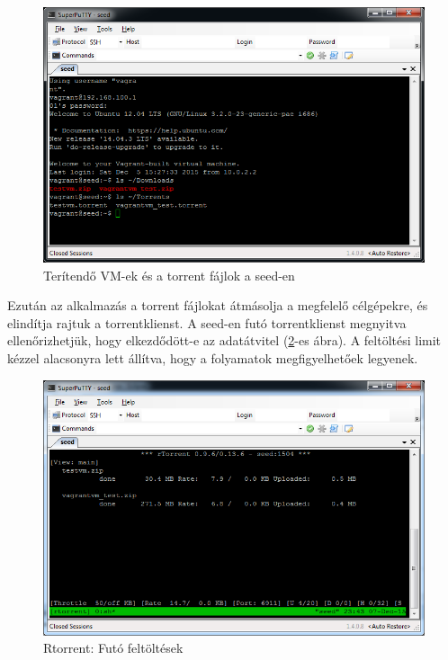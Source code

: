 \begin{figure}[ht]
\centering
\includegraphics[width=140mm, keepaspectratio]{figures/test_seed_files.png}
\caption{Terítendő VM-ek és a torrent fájlok a seed-en}
\label{fig:seed_files}
\end{figure}

Ezután az alkalmazás a torrent fájlokat átmásolja a megfelelő célgépekre, és elindítja rajtuk a torrentklienst. A seed-en futó torrentklienst megnyitva ellenőrizhetjük, hogy elkezdődött-e az adatátvitel (\ref{fig:seed_torrent}-es ábra). A feltöltési limit kézzel alacsonyra lett állítva, hogy a folyamatok megfigyelhetőek legyenek.

\begin{figure}[ht]
\centering
\includegraphics[width=140mm, keepaspectratio]{figures/test_seed_torrent.png}
\caption{Rtorrent: Futó feltöltések}
\label{fig:seed_torrent}
\end{figure}


